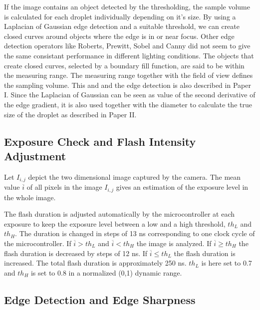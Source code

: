 If the image contains an object detected by the thresholding, the sample volume is calculated for each droplet individually depending on it's size. By using a Laplacian of Gaussian \cite{marr1980, gonz2002} edge detection and a suitable threshold, we can create closed curves around objects where the edge is in or near focus. Other edge detection operators like Roberts, Prewitt, Sobel \cite{gonz2002} and Canny \cite{canny1986} did not seem to give the same consistant performance in different lighting conditions. The objects that create closed curves, selected by a boundary fill function, are said to be within the measuring range. The measuring range together with the field of view defines the sampling volume. This and and the edge detection is also described in Paper I. Since the Laplacian of Gaussian can be seen as value of the second derivative of the edge gradient, it is also used together with the diameter to calculate the true size of the droplet as described in Paper II.

\subsection{Exposure Check and Flash Intensity Adjustment}

Let $I_{i,j}$ depict the two dimensional image captured by the camera. The mean value $\overline{i}$ of all pixels in the image $I_{i,j}$ gives an estimation of the exposure level in the whole image. 

The flash duration is adjusted automatically by the microcontroller at each exposure to keep the exposure level between a low and a high threshold, $th_L$ and $th_H$. The duration is changed in steps of 13 ns corresponding to one clock cycle of the microcontroller. If $\overline{i} > th_L$ and $\overline{i} < th_H$ the image is analyzed. If $\overline{i} \geq th_H$ the flash duration is decreased by steps of 12 ns. If $\overline{i} \leq th_L$ the flash duration is increased. The total flash duration is approximately 250 ns. $th_L$ is here set to 0.7 and $th_H$ is set to 0.8 in a normalized (0,1) dynamic range.

\subsection{Edge Detection and Edge Sharpness}

